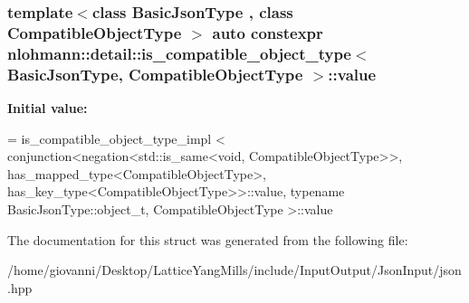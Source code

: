 \subsubsection[{\texorpdfstring{value}{value}}]{\setlength{\rightskip}{0pt plus 5cm}template$<$class Basic\+Json\+Type , class Compatible\+Object\+Type $>$ auto constexpr {\bf nlohmann\+::detail\+::is\+\_\+compatible\+\_\+object\+\_\+type}$<$ Basic\+Json\+Type, Compatible\+Object\+Type $>$\+::value\hspace{0.3cm}{\ttfamily [static]}}\hypertarget{structnlohmann_1_1detail_1_1is__compatible__object__type_a87cce7bcdcd22cc8517f171705f6a7c7}{}\label{structnlohmann_1_1detail_1_1is__compatible__object__type_a87cce7bcdcd22cc8517f171705f6a7c7}
{\bfseries Initial value\+:}
\begin{DoxyCode}
= is\_compatible\_object\_type\_impl <
                                  conjunction<negation<std::is\_same<void, CompatibleObjectType>>,
                                  has\_mapped\_type<CompatibleObjectType>,
                                  has\_key\_type<CompatibleObjectType>>::value,
                                  \textcolor{keyword}{typename} BasicJsonType::object\_t, CompatibleObjectType >::value
\end{DoxyCode}


The documentation for this struct was generated from the following file\+:\begin{DoxyCompactItemize}
\item 
/home/giovanni/\+Desktop/\+Lattice\+Yang\+Mills/include/\+Input\+Output/\+Json\+Input/json.\+hpp\end{DoxyCompactItemize}
